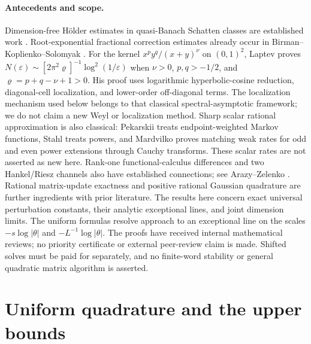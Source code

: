 \documentclass[11pt]{article}
\numberwithin{equation}{section}
\begin{document}
\paragraph{Antecedents and scope.}
Dimension-free H\"older estimates in quasi-Banach Schatten classes
are established work \cite{Ricard,HSZ}. Root-exponential fractional
correction estimates already occur in Birman--Koplienko--Solomyak
\cite{BKS}. For the kernel $x^p y^q/(x+y)^\nu$ on $(0,1)^2$,
Laptev \cite{Laptev} proves
$N(\varepsilon)\sim[2\pi^2\varrho]^{-1}\log^2(1/\varepsilon)$
when $\nu>0$, $p,q>-1/2$, and $\varrho=p+q-\nu+1>0$.
His proof uses logarithmic hyperbolic-cosine reduction,
diagonal-cell localization, and lower-order off-diagonal terms.
The localization mechanism used below belongs to
that classical spectral-asymptotic framework; we do not claim a new
Weyl or localization method. Sharp scalar rational approximation is
also classical:
Pekarskii \cite{Pekarskii} treats endpoint-weighted Markov functions,
Stahl \cite{Stahl} treats powers, and Mardvilko \cite{Mardvilko}
proves matching weak rates for odd and even power extensions through
Cauchy transforms. These scalar rates are not asserted as new here.
Rank-one functional-calculus differences and two Hankel/Riesz
channels also have established connections; see Arazy--Zelenko
\cite[Introduction and Section 4]{AZ}. Rational matrix-update exactness
\cite{BCKS} and positive rational
Gaussian quadrature \cite{Gautschi} are further ingredients with prior
literature. The results here concern exact universal perturbation
constants, their analytic exceptional lines, and joint dimension limits.
The uniform formulas resolve approach to an exceptional line on the
scales $-s\log|\theta|$ and $-L^{-1}\log|\theta|$.
The proofs have received internal mathematical reviews; no priority
certificate or external peer-review claim is made. Shifted solves must
be paid for separately, and no finite-word stability or general quadratic
matrix algorithm is asserted.

\section{Uniform quadrature and the upper bounds}
\end{document}
